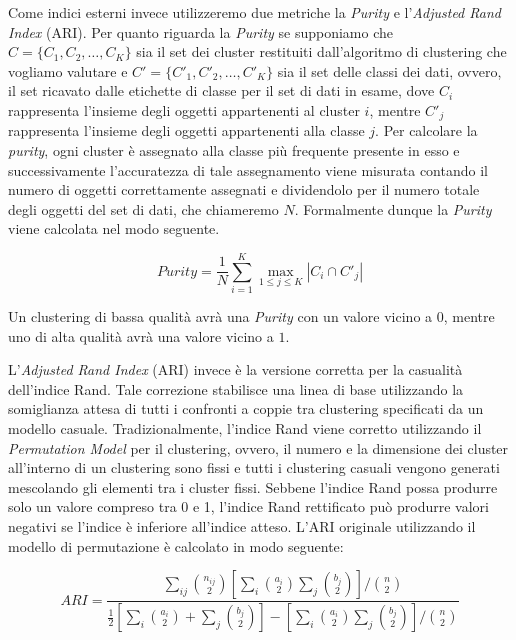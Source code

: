 \documentclass[12pt]{article}
\begin{document}
Come indici esterni invece utilizzeremo due metriche la \textit{Purity} e l'\textit{Adjusted Rand Index} (ARI). Per quanto riguarda la \textit{Purity} se supponiamo che $C=\{C_1,C_2,\ldots,C_K\}$ sia il set dei cluster restituiti dall'algoritmo di clustering che vogliamo valutare e $C'=\{C'_1,C'_2,\ldots,C'_K\}$ sia il set delle classi dei dati, ovvero, il set ricavato dalle etichette di classe per il set di dati in esame, dove $C_i$ rappresenta l'insieme degli oggetti appartenenti al cluster $i$, mentre $C'_j$ rappresenta l'insieme degli oggetti appartenenti alla classe $j$. Per calcolare la \textit{purity}, ogni cluster è assegnato alla classe più frequente presente in esso e successivamente l'accuratezza di tale assegnamento viene misurata contando il numero di oggetti correttamente assegnati e dividendolo per il numero totale degli oggetti del set di dati, che chiameremo $N$. Formalmente dunque la \textit{Purity} viene calcolata nel modo seguente.

\begin{equation}
	Purity = \frac{1}{N}\sum_{i=1}^{K}\max_{1\leq j\leq K}|C_i\cap C'_j|
	\label{eq:purity}
\end{equation}

Un clustering di bassa qualità avrà una \textit{Purity} con un valore vicino a $0$, mentre uno di alta qualità avrà una valore vicino a $1$.

L'\textit{Adjusted Rand Index} (ARI) invece è la versione corretta per la casualità dell'indice Rand. Tale correzione stabilisce una linea di base utilizzando la somiglianza attesa di tutti i confronti a coppie tra clustering specificati da un modello casuale. Tradizionalmente, l'indice Rand viene corretto utilizzando il \textit{Permutation Model} per il clustering, ovvero, il numero e la dimensione dei cluster all'interno di un clustering sono fissi e tutti i clustering casuali vengono generati mescolando gli elementi tra i cluster fissi. Sebbene l'indice Rand possa produrre solo un valore compreso tra 0 e 1, l'indice Rand rettificato può produrre valori negativi se l'indice è inferiore all'indice atteso. L'ARI originale utilizzando il modello di permutazione è calcolato in modo seguente:

\begin{equation}
	ARI = \frac{\sum_{ij} \binom{n_{ij}}{2} [\sum_{i} \binom{a_i}{2}\sum_{j}\binom{b_j}{2}]/\binom{n}{2}}{\frac{1}{2}[\sum_{i} \binom{a_i}{2} + \sum_{j} \binom{b_j}{2}] - [\sum_{i} \binom{a_i}{2}\sum_{j} \binom{b_j}{2}]/\binom{n}{2}}
	\label{eq:ari}
\end{equation}
\end{document}
